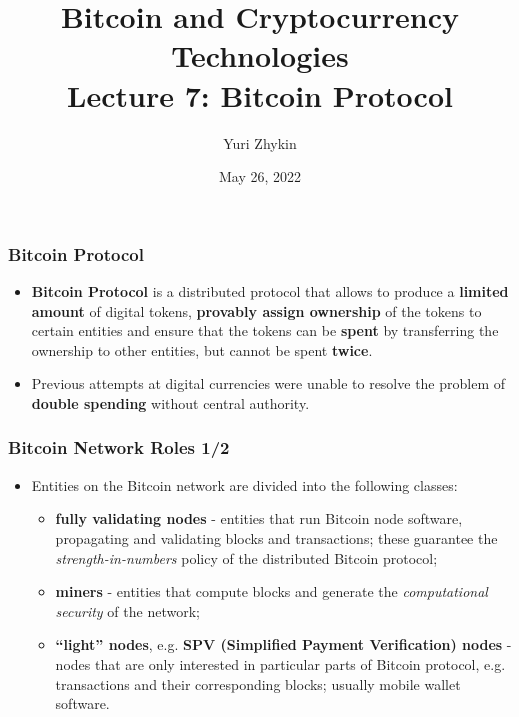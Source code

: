 \documentclass{beamer}
\title{
  Bitcoin and Cryptocurrency Technologies \\
  Lecture 7: Bitcoin Protocol
}
\author{Yuri Zhykin}
\date{May 26, 2022}
\begin{document}
\frame{\titlepage}

\begin{frame}
  \frametitle{Bitcoin Protocol}
  \begin{itemize}
  \item \textbf{Bitcoin Protocol} is a distributed protocol that allows to
    produce a \textbf{limited amount} of digital tokens, \textbf{provably assign
      ownership} of the tokens to certain entities and ensure that the tokens
    can be \textbf{spent} by transferring the ownership to other entities, but
    cannot be spent \textbf{twice}.
  \item Previous attempts at digital currencies were unable to resolve the
    problem of \textbf{double spending} without central authority.
  \end{itemize}
\end{frame}

\begin{frame}
  \frametitle{Bitcoin Network Roles 1/2}
  \begin{itemize}
  \item Entities on the Bitcoin network are divided into the following classes:
    \begin{itemize}
    \item \textbf{fully validating nodes} - entities that run Bitcoin node
      software, propagating and validating blocks and transactions; these
      guarantee the \textit{strength-in-numbers} policy of the distributed
      Bitcoin protocol;
    \item \textbf{miners} - entities that compute blocks and generate the
      \textit{computational security} of the network;
    \item \textbf{``light'' nodes}, e.g. \textbf{SPV (Simplified Payment
        Verification) nodes} - nodes that are only interested in particular
      parts of Bitcoin protocol, e.g. transactions and their corresponding
      blocks; usually mobile wallet software.
    \end{itemize}
  \end{itemize}
\end{frame}
\end{document}
